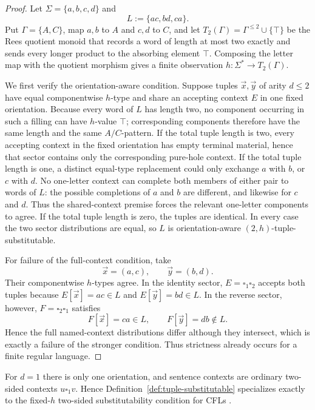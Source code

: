 \documentclass[11pt,a4paper]{article}
\numberwithin{equation}{section}
\theoremstyle{plain}
\theoremstyle{definition}
\theoremstyle{remark}
\newcommand{\tuple}[1]{\vec{#1}}
\newcommand{\blank}{\square}
\begin{document}
\begin{proof}
Let \(\Sigma=\{a,b,c,d\}\) and
\[
  L:=\{ac,bd,ca\}.
\]
Put \(\Gamma=\{A,C\}\), map \(a,b\) to \(A\) and \(c,d\) to \(C\), and let
\(T_2(\Gamma)=\Gamma^{\le2}\cup\{\top\}\) be the Rees quotient monoid that
records a word of length at most two exactly and sends every longer product to
the absorbing element \(\top\).  Composing the letter map with the quotient
morphism gives a finite observation \(h:\Sigma^*\to T_2(\Gamma)\).

We first verify the orientation-aware condition.  Suppose tuples
\(\tuple x,\tuple y\) of arity \(d\le2\) have equal componentwise
\(h\)-type and share an accepting context \(E\) in one fixed orientation.
Because every word of \(L\) has length two, no component occurring in such a
filling can have \(h\)-value \(\top\); corresponding components therefore
have the same length and the same \(A/C\)-pattern.  If the total tuple length
is two, every accepting context in the fixed orientation has empty terminal
material, hence that sector contains only the corresponding pure-hole
context.  If the total tuple length is one, a distinct equal-type replacement
could only exchange \(a\) with \(b\), or \(c\) with \(d\).  No one-letter
context can complete both members of either pair to words of \(L\): the
possible completions of \(a\) and \(b\) are different, and likewise for
\(c\) and \(d\).  Thus the shared-context premise forces the relevant
one-letter components to agree.  If the total tuple length is zero, the tuples
are identical.  In every case the two sector distributions are equal, so
\(L\) is orientation-aware \((2,h)\)-tuple-substitutable.

For failure of the full-context condition, take
\[
  \tuple x=(a,c),\qquad \tuple y=(b,d).
\]
Their componentwise \(h\)-types agree.  In the identity sector,
\(E=\blank_1\blank_2\) accepts both tuples because
\(E[\tuple x]=ac\in L\) and \(E[\tuple y]=bd\in L\).  In the reverse sector,
however, \(F=\blank_2\blank_1\) satisfies
\[
  F[\tuple x]=ca\in L,
  \qquad
  F[\tuple y]=db\notin L.
\]
Hence the full named-context distributions differ although they intersect,
which is exactly a failure of the stronger condition.  Thus strictness already
occurs for a finite regular language.
\end{proof}

For \(d=1\) there is only one orientation, and sentence contexts are ordinary
two-sided contexts \(u\blank_1v\).  Hence
Definition~\ref{def:tuple-substitutable} specializes exactly to the fixed-\(h\)
two-sided substitutability condition for CFLs \cite{kuriyamaCFG}.
\end{document}
